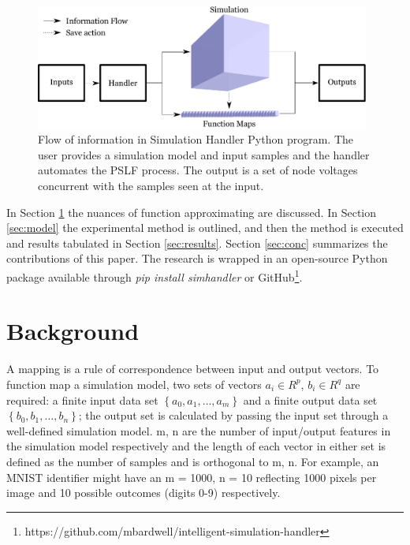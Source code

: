 \documentclass[conference]{IEEEtran}
\begin{document}
\begin{figure}[h]
	\centering
	\includegraphics[width=11cm]{informationflow.pdf}
	\caption{Flow of information in Simulation Handler Python program. The user provides a simulation model and input samples and the handler automates the PSLF process. The output is a set of node voltages concurrent with the samples seen at the input.}
	\label{fig:infoflow}
\end{figure}

In Section \ref{sec:relwork} the nuances of function approximating are discussed. In Section \ref{sec:model} the experimental method is outlined, and then the method is executed and results tabulated in Section \ref{sec:results}. Section \ref{sec:conc} summarizes the contributions of this paper. The research is wrapped in an open-source Python package available through \textit{pip install simhandler} or GitHub\footnote{https://github.com/mbardwell/intelligent-simulation-handler}.


\section{Background}
\label{sec:relwork}
A mapping is a rule of correspondence between input and output vectors. To function map a simulation model, two sets of vectors $a_{i} \in R^{p}$, $b_{i} \in R^{q}$ are required: a finite input data set $\left\{a_{0}, a_{1}, \ldots, a_{m}\right\}$ and a finite output data set $\left\{b_{0}, b_{1}, \ldots, b_{n}\right\}$; the output set is calculated by passing the input set through a well-defined simulation model. m, n are the number of input/output features in the simulation model respectively and the length of each vector in either set is defined as the number of samples and is orthogonal to m, n. For example, an MNIST identifier might have an m = 1000, n = 10 reflecting 1000 pixels per image and 10 possible outcomes (digits 0-9) respectively.
\end{document}
